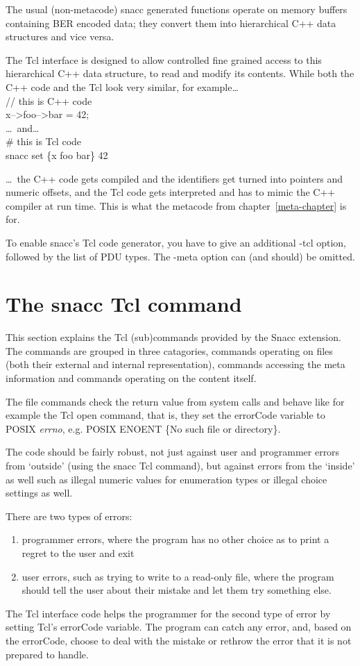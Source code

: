 The usual (non-metacode) snacc generated functions operate on memory buffers containing BER encoded data; they convert them into hierarchical C++ data structures and vice versa.

The Tcl interface is designed to allow controlled fine grained access to this hierarchical C++ data structure, to read and modify its contents.
While both the C++ code and the Tcl look very similar, for example\dots\\[1ex]
{\C
// this is C++ code\\
x-->foo-->bar = 42;\\[1ex]
}
\dots\ and\dots\\[1ex]
{\Tcl
\# this is Tcl code\\
snacc set \{x foo bar\} 42
}

\dots\ the C++ code gets compiled and the identifiers get turned into pointers and numeric offsets, and the Tcl code gets interpreted and has to mimic the C++ compiler at run time.
This is what the metacode from chapter~\ref{meta-chapter} is for.

To enable snacc's Tcl code generator, you have to give an additional {\ufn -tcl} option, followed by the list of PDU types.
The {\ufn -meta} option can (and should) be omitted.

\section{The {\Tcl snacc} Tcl command}

This section explains the Tcl (sub)commands provided by the Snacc extension.
The commands are grouped in three catagories, commands operating on files (both their external and internal representation), commands accessing the meta information and commands operating on the content itself.

The file commands check the return value from system calls and behave like for example the Tcl {\Tcl open} command, that is, they set the {\Tcl errorCode} variable to {\Tcl POSIX \emph{errno}}, e.g. {\Tcl POSIX ENOENT \{No such file or directory\}}.

The code should be fairly robust, not just against user and programmer errors from `outside' (using the {\Tcl snacc} Tcl command), but against errors from the `inside' as well such as illegal numeric values for enumeration types or illegal choice settings as well.

There are two types of errors:
\begin{enumerate}
  \item programmer errors, where the program has no other choice as to print a regret to the user and exit
  \item user errors, such as trying to write to a read-only file, where the program should tell the user about their mistake and let them try something else.
\end{enumerate}
The Tcl interface code helps the programmer for the second type of error by setting Tcl's {\Tcl errorCode} variable.
The program can {\Tcl catch} any error, and, based on the {\Tcl errorCode}, choose to deal with the mistake or rethrow the error that it is not prepared to handle.

